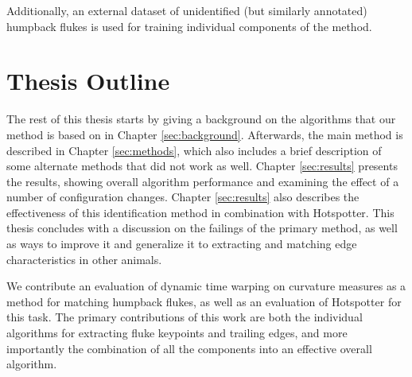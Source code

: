 
Additionally, an external dataset of unidentified (but similarly annotated) humpback flukes is used for training individual components of the method.


\section{Thesis Outline}


The rest of this thesis starts by giving a background on the algorithms that our method is based on in Chapter \ref{sec:background}.
Afterwards, the main method is described in Chapter \ref{sec:methods}, which also includes a brief description of some alternate methods that did not work as well.
Chapter \ref{sec:results} presents the results, showing overall algorithm performance and examining the effect of a number of configuration changes.
Chapter \ref{sec:results} also describes the effectiveness of this identification method in combination with Hotspotter.
This thesis concludes with a discussion on the failings of the primary method, as well as ways to improve it and generalize it to extracting and matching edge characteristics in other animals.

We contribute an evaluation of dynamic time warping on curvature measures as a method for matching humpback flukes, as well as an evaluation of Hotspotter for this task.
The primary contributions of this work are both the individual algorithms for extracting fluke keypoints and trailing edges, and more importantly the combination of all the components into an effective overall algorithm.







